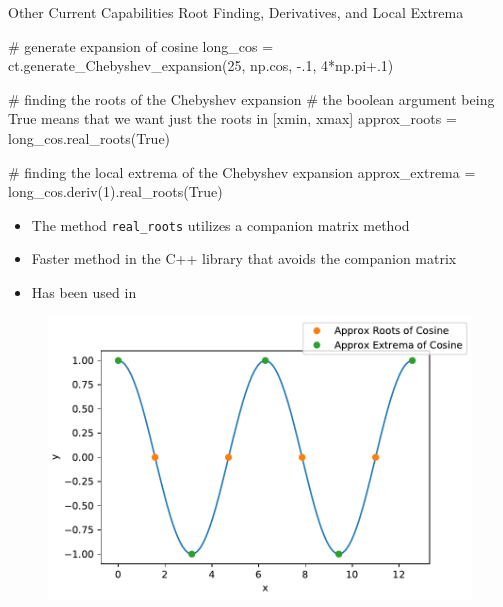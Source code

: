 \documentclass[final]{beamer}
\begin{document}
\begin{frame}[fragile]{}
\begin{columns}[t]
  \begin{column}{.31\linewidth}
\begin{block}{Other Current Capabilities}
{\color{numhypRed} Root Finding, Derivatives, and Local Extrema}\\

\begin{python}
# generate expansion of cosine
long_cos = ct.generate_Chebyshev_expansion(25, np.cos, -.1, 4*np.pi+.1)

# finding the roots of the Chebyshev expansion
# the boolean argument being True means that we want just the roots in [xmin, xmax]
approx_roots = long_cos.real_roots(True)

# finding the local extrema of the Chebyshev expansion
approx_extrema = long_cos.deriv(1).real_roots(True)
\end{python}

	\begin{minipage}{.4\linewidth}
		\begin{itemize}
		\item The method {\tt real\_roots} utilizes a companion matrix method \cite{boyd_2013}
		\item Faster method in the C++ library that avoids the companion matrix
		\item Has been used in \cite{bell_2018-2}
		\end{itemize}
	\end{minipage}%
	\hfill%
	\begin{minipage}{.55\linewidth}
	\begin{figure}
	\includegraphics[width = \textwidth]{cos_roots.pdf}
	\end{figure}
	\end{minipage}%
\end{block}




\end{column}
\end{columns}
\end{frame}
\end{document}
